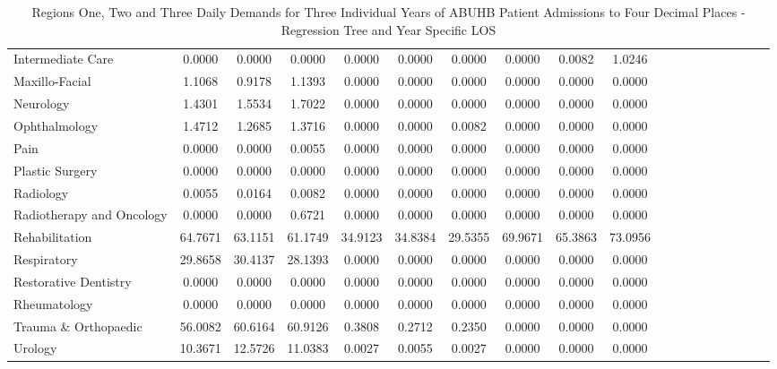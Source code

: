 \documentclass[thesis.tex]{subfiles}
\begin{document}
\begin{landscape}
\begin{table}[h!]
{\begin{tabular}{lcccccccccccccccccc}
Intermediate Care&	0.0000&	0.0000&	0.0000&	0.0000&	0.0000&	0.0000&	0.0000&	0.0082&	1.0246\\
Maxillo-Facial&	1.1068&	0.9178&	1.1393&	0.0000&	0.0000&	0.0000&	0.0000&	0.0000&	0.0000\\
Neurology	&1.4301&	1.5534&	1.7022&	0.0000&	0.0000&	0.0000&	0.0000&	0.0000&	0.0000\\
Ophthalmology	&1.4712&	1.2685&	1.3716&	0.0000&	0.0000&	0.0082&	0.0000&	0.0000&	0.0000\\
Pain	&0.0000&	0.0000&	0.0055&	0.0000&	0.0000&	0.0000&	0.0000&	0.0000&	0.0000\\
Plastic Surgery&	0.0000&	0.0000&	0.0000&	0.0000&	0.0000&	0.0000&	0.0000&	0.0000&	0.0000\\
Radiology	&0.0055&	0.0164&	0.0082&	0.0000&	0.0000&	0.0000&	0.0000&	0.0000&	0.0000\\
Radiotherapy and Oncology&	0.0000&	0.0000&	0.6721&	0.0000&	0.0000&	0.0000&	0.0000&	0.0000&	0.0000\\
Rehabilitation	&64.7671&	63.1151&	61.1749&	34.9123&	34.8384&	29.5355&	69.9671&	65.3863&	73.0956\\
Respiratory	&29.8658&	30.4137&	28.1393&	0.0000&	0.0000&	0.0000&	0.0000&	0.0000&	0.0000\\
Restorative Dentistry&	0.0000&	0.0000&	0.0000&	0.0000&	0.0000&	0.0000&	0.0000&	0.0000&	0.0000\\
Rheumatology	&0.0000&	0.0000&	0.0000&	0.0000&	0.0000&	0.0000&	0.0000&	0.0000&	0.0000\\
Trauma \& Orthopaedic&	56.0082&	60.6164&	60.9126&	0.3808&	0.2712&	0.2350&	0.0000&	0.0000&	0.0000\\
Urology	&10.3671&	12.5726&	11.0383&	0.0027&	0.0055&	0.0027&	0.0000&	0.0000&	0.0000\\

\bottomrule
\end{tabular}  } 
\caption{Regions One, Two and Three Daily Demands for Three Individual Years of ABUHB Patient Admissions to Four Decimal Places - Regression Tree and Year Specific LOS}
    \label{apptab:LinkedDemands5a}
\end{table}


\end{landscape}
\end{document}
